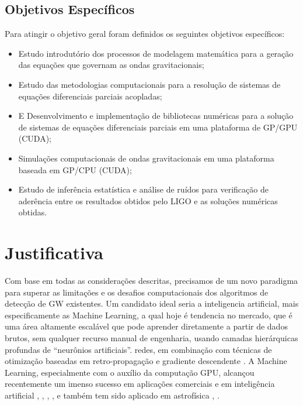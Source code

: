 \subsection{Objetivos Específicos}
Para atingir o objetivo geral foram definidos os seguintes objetivos específicos: 
\begin{itemize}

\item Estudo introdutório dos processos de modelagem matemática para a geração das equações que governam as ondas gravitacionais;
\item Estudo das metodologias computacionais para a resolução de sistemas de equações diferenciais parciais acopladas;
\item E Desenvolvimento e implementação de bibliotecas numéricas para a solução de sistemas de equações diferenciais parciais em uma plataforma de GP/GPU (CUDA);
\item Simulações computacionais de ondas gravitacionais em uma plataforma baseada em GP/CPU (CUDA);
\item Estudo de inferência estatística e análise de ruídos para verificação de aderência entre os resultados obtidos pelo LIGO e as soluções numéricas obtidas.

\end{itemize}
\section{Justificativa}

Com base em todas as considerações descritas, precisamos de um novo paradigma para superar as limitações e os desafios computacionais dos algoritmos de detecção de GW existentes. Um candidato ideal seria a inteligencia artificial, mais especificamente as Machine Learning, a qual hoje é tendencia no mercado, que é uma área  altamente escalável que pode aprender diretamente a partir de dados brutos, sem qualquer recurso manual de engenharia, usando camadas hierárquicas profundas de “neurônios artificiais”. redes, em combinação com técnicas de otimização baseadas em retro-propagação e gradiente descendente \cite{barca2005treinamento}. A Machine Learning, especialmente com o auxílio da computação GPU, alcançou recentemente um imenso sucesso em aplicações comerciais e em inteligência artificial \cite{esteva2017dermatologist}, \cite{moravvcik2017deepstack}, \cite{van2016wavenet}, \cite{10.1007/978-3-319-44188-7_16}, e também tem sido aplicado em astrofísica \cite{george2017glitch}, \cite{george2017deepA}.